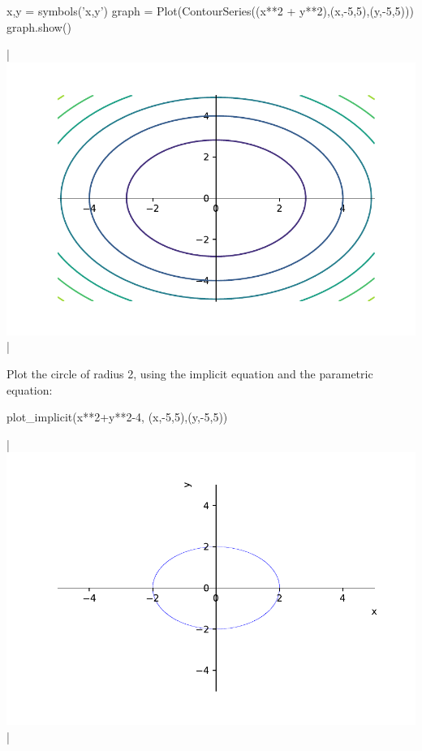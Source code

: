 \begin{example}
\begin{pyin}
    x,y = symbols('x,y')
    graph = Plot(ContourSeries((x**2 + y**2),(x,-5,5),(y,-5,5)))
    graph.show()
\end{pyin}
\begin{pyout}
    |\includegraphics{figures/Sympy/fig_sympy_5.pdf}|
\end{pyout}
	Plot the circle of radius 2, using the implicit equation and the parametric equation:
	
\begin{pyin}
    plot_implicit(x**2+y**2-4, (x,-5,5),(y,-5,5))
\end{pyin}
\begin{pyout}
    |\includegraphics{figures/Sympy/fig_sympy_6.pdf}|
\end{pyout}


\end{example}
